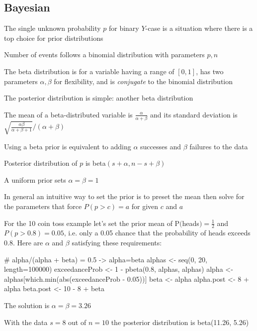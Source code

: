 \subsection{Bayesian}
\bi
\item The single unknown probability $p$ for binary $Y$-case is a
  situation where there is a top choice for prior distributions
\item Number of events follows a binomial distribution with parameters
  $p, n$
\item The beta distribution is for a variable having a range of $[0,
  1]$, has two parameters $\alpha, \beta$ for
  flexibility, and is \emph{conjugate} to the binomial distribution
  \bi
  \item The posterior distribution is simple: another beta distribution
  \ei
\item The mean of a beta-distributed variable is $\frac{\alpha}{\alpha
    + \beta}$ and its standard deviation is\\
  $\sqrt{\frac{\alpha\beta}{\alpha+\beta+1}} / (\alpha + \beta)$
\item Using a beta prior is equivalent to adding $\alpha$ successes
  and $\beta$ failures to the data
\item Posterior distribution of $p$ is beta$(s + \alpha, n - s + \beta)$
\item A uniform prior sets $\alpha = \beta = 1$
\item In general an intuitive way to set the prior is to preset the
  mean then solve for the parameters that force $P(p > c) = a$ for
  given $c$ and $a$
\item For the 10 coin toss example let's set the prior mean of
  P$($heads$)=\frac{1}{2}$ and $P(p > 0.8) = 0.05$, i.e. only a 0.05
  chance that the probability of heads exceeds 0.8.  Here are $\alpha$
  and $\beta$ satisfying these requirements:
\begin{Schunk}
\begin{Sinput}
# alpha/(alpha + beta) = 0.5 -> alpha=beta
alphas <- seq(0, 20, length=100000)
exceedanceProb <- 1 - pbeta(0.8, alphas, alphas)
alpha <- alphas[which.min(abs(exceedanceProb - 0.05))]
beta  <- alpha
alpha.post <- 8 + alpha
beta.post  <- 10 - 8 + beta
\end{Sinput}
\end{Schunk}
\item The solution is $\alpha=\beta=3.26$
\item With the data $s=8$ out of $n=10$ the posterior distribution is
  beta(11.26, 5.26)

